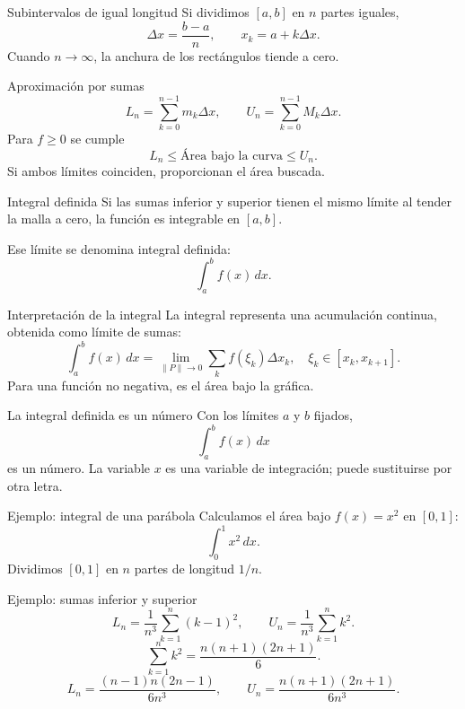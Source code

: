 \documentclass[original_version/main.tex]{subfiles}
\begin{document}
\begin{frame}{Subintervalos de igual longitud}
Si dividimos $[a,b]$ en $n$ partes iguales,\[\Delta x=\frac{b-a}{n},\qquad x_k=a+k\Delta x.\]Cuando $n\to\infty$, la anchura de los rectángulos tiende a cero.
\end{frame}

\begin{frame}{Aproximación por sumas}
\[L_n=\sum_{k=0}^{n-1}m_k\Delta x,\qquad U_n=\sum_{k=0}^{n-1}M_k\Delta x.\]Para $f\ge0$ se cumple\[L_n\le\text{Área bajo la curva}\le U_n.\]Si ambos límites coinciden, proporcionan el área buscada.
\end{frame}

\begin{frame}{Integral definida}
Si las sumas inferior y superior tienen el mismo límite al tender la malla a cero, la función es integrable en $[a,b]$.\par\medskip Ese límite se denomina \alert{integral definida}:\[\int_a^b f(x)\,dx.\]
\end{frame}

\begin{frame}{Interpretación de la integral}
La integral representa una acumulación continua, obtenida como límite de sumas:\[\int_a^b f(x)\,dx=\lim_{\|P\|\to0}\sum_k f(\xi_k)\Delta x_k,\quad \xi_k\in[x_k,x_{k+1}].\]Para una función no negativa, es el área bajo la gráfica.
\end{frame}

\begin{frame}{La integral definida es un número}
Con los límites $a$ y $b$ fijados,\[\int_a^b f(x)\,dx\]es un número. La variable $x$ es una variable de integración; puede sustituirse por otra letra.
\end{frame}

\begin{frame}{Ejemplo: integral de una parábola}
Calculamos el área bajo $f(x)=x^2$ en $[0,1]$:\[\int_0^1 x^2\,dx.\]Dividimos $[0,1]$ en $n$ partes de longitud $1/n$.
\end{frame}

\begin{frame}{Ejemplo: sumas inferior y superior}
\small\[L_n=\frac{1}{n^3}\sum_{k=1}^n(k-1)^2,\qquad U_n=\frac{1}{n^3}\sum_{k=1}^n k^2.\]\[\sum_{k=1}^n k^2=\frac{n(n+1)(2n+1)}6.\]\[L_n=\frac{(n-1)n(2n-1)}{6n^3},\qquad U_n=\frac{n(n+1)(2n+1)}{6n^3}.\]
\end{frame}
\end{document}
